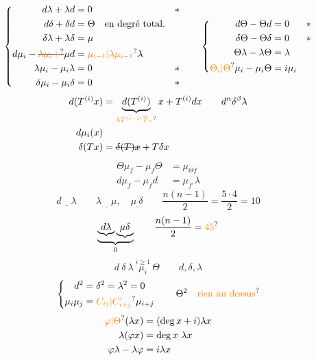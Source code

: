 \[
\left\{\begin{aligned}
 d\lambda+\lambda d&=0 &&*\\
 d\delta+\delta d&=\Theta\quad\text{en degré total}.\\
 \delta\lambda+\lambda\delta&=\mu\\
 d\mu_i-\deleted{\unsure{\lambda\mu_i+}}\mu d&=\unsure{\mu_{i-1}|\lambda\mu_{i-1}}\lambda\\
 \lambda\mu_i-\mu_i\lambda&=0 &&*\\
 \delta\mu_i-\mu_i\delta&=0 &&*
\end{aligned}\right.
\qquad
\left\{\begin{aligned}
 d\Theta-\Theta d&=0 &&*\\
 \delta\Theta-\Theta\delta&=0 &&*\\
 \Theta\lambda-\lambda\Theta&=\lambda\\
 \unsure{\Theta_i|\Theta}\mu_i-\mu_i\Theta&=i\mu_i
\end{aligned}\right.
\]
\[
\begin{aligned}
 d(T^{(i)}x)&=\underbrace{d(T^{(i)})}_{\unsure{\lambda T^{(i-1)}\overline T_{\wedge}}}x+T^{(i)}dx
 \qquad d^\alpha\delta^\beta\lambda\\
 d\mu_i(x)&\\
 \delta(Tx)&=\deleted{\delta(T)x}+T\delta x
\end{aligned}
\]
\[
 \boxed{\begin{aligned}
 \Theta\mu_f-\mu_f\Theta&=\mu_{\Theta f}\\
 d\mu_f-\mu_f d&=\mu_{f'}\lambda
 \end{aligned}}
\]
\[
 \underline{d\quad\lambda}\qquad\underline{\lambda\quad\mu},\quad
 \underline{\mu\ \delta}
 \qquad \frac{n(n-1)}2=\frac{5\cdot4}2=10
\]
\[
 \underbrace{\underbrace{d\lambda}\underbrace{\mu\delta}}_{0}
 \qquad \frac{n(n-1)}2=\unsure{45}
\]
\[
 d\ \delta\ \lambda\ \overset{i\geq1}{\mu_i}\ \Theta\qquad d,\delta,\lambda
\]
\[
 \left\{\begin{aligned}
 d^2&=\delta^2=\lambda^2=0\\
 \mu_i\mu_j&=\unsure{C_{ij}|C^i_{i+j}}\mu_{i+j}
 \end{aligned}\right.\qquad
 \Theta^2\quad\text{\unsure{rien au dessus}}
\]
\[
 \begin{aligned}
 \unsure{\varphi|\Theta}(\lambda x)&=(\deg x+i)\lambda x\\
 \lambda(\varphi x)&=\deg x\ \lambda x\\
 \varphi\lambda-\lambda\varphi&=i\lambda x
 \end{aligned}
\]
